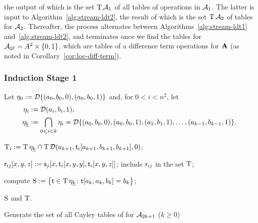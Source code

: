 the output of which is the set $\operatorname{T} \mathcal{A}_1$ of all tables of 
operations in $\mathcal{A}_1$.
The latter is input to Algorithm~\ref{alg:stream-ldt2}, the result of which is
the set $\operatorname{T} \mathcal{A}_2$ of tables for $\mathcal{A}_2$.
Thereafter, the process alternates between
Algorithms~\ref{alg:stream-ldt1} and~\ref{alg:stream-ldt2}, and 
terminates once we find the tables for $\mathcal{A}_{2\ell} = A^2 \times \{0,1\}$,
which are tables of a difference term operations for $\mathbf{A}$ (as noted
in Corollary~\ref{cor:loc-diff-term}).

\subsubsection{Induction Stage 1}
Let $\eta_0 := \mathcal{D} \{(a_0, b_0, 0), (a_0, b_0, 1)\}$ and, for $0 < i < n^2$, let
\begin{align*}
  \eta_i &:= \mathcal{D} (a_i, b_i, 1),\\
  \eta_{\underline{k}} &:= \bigcap_{0\leqslant i < k}\eta_i
  =\mathcal{D} \{(a_0, b_0, 0),(a_0, b_0, 1), (a_1, b_1, 1), \dots, (a_{k-1}, b_{k-1}, 1) \}.
\end{align*}

\begin{algorithm}


   {

    $\operatorname{T}_i := \operatorname{T} \eta_{\underline{k}} \cap \operatorname{T} \mathcal{D} (a_{k+1}, \mathsf{t}_i[a_{k+1}, b_{k+1}, b_{k+1}], 0)$;

     {
        {
        $\mathsf{r}_{ij}[x,y,z] :=  \mathsf{s}_j[x, \mathsf{t}_i[x,y,y], \mathsf{t}_i[x,y,z]]$;
      }
      include $\mathsf{r}_{ij}$ in the set $\operatorname{T}$;
    }
  }
  compute $\operatorname{S}  := \bigl\{\mathsf{t} \in \operatorname{T} \eta_{\underline{k}} \colon \mathsf{t}[a_k,a_k,b_k]= b_k \bigr\}$;

  \Return $\operatorname{S}$ and $\operatorname{T}$.
  \caption{Generate the set of all Cayley tables of \ldtos for $\mathcal{A}_{2k+1}$ \label{alg:stream-ldt1} {\small ($k\geq 0$)}}
\end{algorithm}

